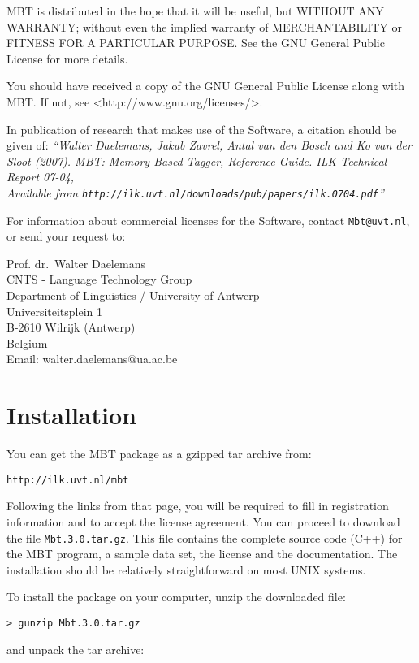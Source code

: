 \documentclass{report}
\begin{document}
MBT is distributed in the hope that it will be useful, but WITHOUT
ANY WARRANTY; without even the implied warranty of MERCHANTABILITY or
FITNESS FOR A PARTICULAR PURPOSE.  See the GNU General Public License
for more details.

You should have received a copy of the GNU General Public License
along with MBT.  If not, see <http://www.gnu.org/licenses/>.

In publication of research that makes use of the Software, a
citation should be given of: {\em ``Walter Daelemans, Jakub Zavrel,
Antal van den Bosch and Ko van der Sloot (2007). MBT: Memory-Based
Tagger, Reference Guide. ILK Technical Report 07-04, \\
Available from
{\tt http://ilk.uvt.nl/downloads/pub/papers/ilk.0704.pdf}''}

For information about commercial licenses for the Software,
contact {\tt Mbt@uvt.nl}, or send your request to:

Prof. dr.~Walter Daelemans\\
CNTS - Language Technology Group\\
Department of Linguistics / University of Antwerp\\
Universiteitsplein 1\\
B-2610 Wilrijk (Antwerp)\\
Belgium\\
Email: walter.daelemans@ua.ac.be

\pagestyle{headings}

\chapter{Installation}
\vspace{-1cm}
You can get the MBT package as a gzipped tar archive from:

{\tt http://ilk.uvt.nl/mbt}

Following the links from that page, you will be required to fill in
registration information and to accept the license agreement. You can
proceed to download the file {\tt Mbt.3.0.tar.gz}. This file contains
the complete source code (C++) for the MBT program, a sample
data set, the license and the documentation. The installation should
be relatively straightforward on most UNIX systems.

To install the package on your computer, unzip the downloaded file:

{\tt > gunzip Mbt.3.0.tar.gz}

and unpack the tar archive:
\end{document}
